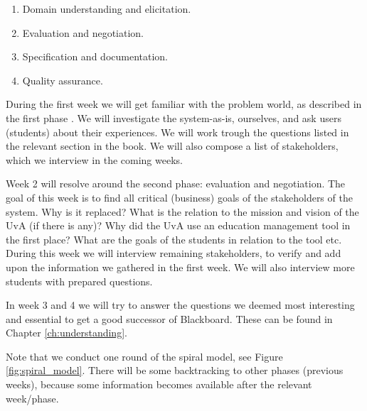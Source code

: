 \begin{enumerate}
	\item Domain understanding and elicitation.
	\item Evaluation and negotiation.
	\item Specification and documentation.
	\item Quality assurance.
\end{enumerate}

During the first week we will get familiar with the problem world, as described in the first phase \cite{RE_book}. We will investigate the system-as-is, ourselves, and ask users (students) about their experiences. We will work trough the questions listed in the relevant section in the book. We will also compose a list of stakeholders, which we interview in the coming weeks.

Week 2 will resolve around the second phase: evaluation and negotiation. The goal of this week is to find all critical (business) goals of the stakeholders of the system. Why is it replaced? What is the relation to the mission and vision of the UvA (if there is any)? Why did the UvA use an education management tool in the first place? What are the goals of the students in relation to the tool etc. During this week we will interview remaining stakeholders, to verify and add upon the information we gathered in the first week. We will also interview more students with prepared questions.



In week 3 and 4 we will try to answer the questions we deemed most interesting and essential to get a good successor of Blackboard. These can be found in Chapter \ref{ch:understanding}.

Note that we conduct one round of the spiral model, see Figure \ref{fig:spiral_model}. There will be some backtracking to other phases (previous weeks), because some information becomes available after the relevant week/phase. 

